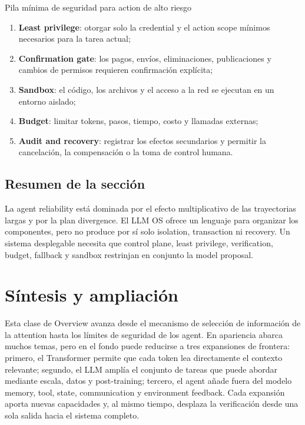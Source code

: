 \documentclass[a4paper]{article}
\begin{document}
\begin{importantbox}{Pila mínima de seguridad para action de alto riesgo}
\begin{enumerate}
  \item \textbf{Least privilege}: otorgar solo la credential y el action scope mínimos necesarios para la tarea actual;
  \item \textbf{Confirmation gate}: los pagos, envíos, eliminaciones, publicaciones y cambios de permisos requieren confirmación explícita;
  \item \textbf{Sandbox}: el código, los archivos y el acceso a la red se ejecutan en un entorno aislado;
  \item \textbf{Budget}: limitar tokens, pasos, tiempo, costo y llamadas externas;
  \item \textbf{Audit and recovery}: registrar los efectos secundarios y permitir la cancelación, la compensación o la toma de control humana.
\end{enumerate}
\end{importantbox}


\subsection{Resumen de la sección}

La agent reliability está dominada por el efecto multiplicativo de las trayectorias largas y por la plan divergence. El LLM OS ofrece un lenguaje para organizar los componentes, pero no produce por sí solo isolation, transaction ni recovery. Un sistema desplegable necesita que control plane, least privilege, verification, budget, fallback y sandbox restrinjan en conjunto la model proposal.
\section{Síntesis y ampliación}

Esta clase de Overview avanza desde el mecanismo de selección de información de la attention hasta los límites de seguridad de los agent. En apariencia abarca muchos temas, pero en el fondo puede reducirse a tres expansiones de frontera: primero, el Transformer permite que cada token lea directamente el contexto relevante; segundo, el LLM amplía el conjunto de tareas que puede abordar mediante escala, datos y post-training; tercero, el agent añade fuera del modelo memory, tool, state, communication y environment feedback. Cada expansión aporta nuevas capacidades y, al mismo tiempo, desplaza la verificación desde una sola salida hacia el sistema completo.
\end{document}
